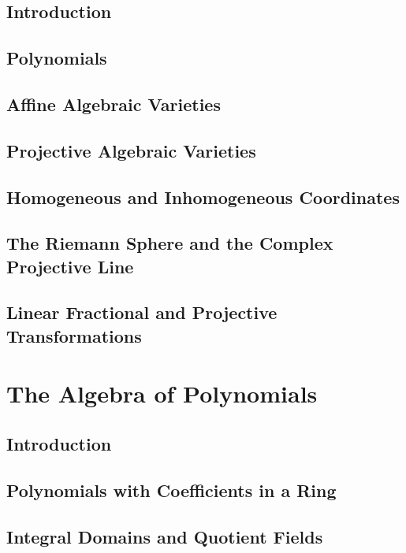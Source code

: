 \documentclass[12pt]{book}
\theoremstyle{plain}
\theoremstyle{definition}
\begin{document}
\section{Introduction}

\section{Polynomials}

\section{Affine Algebraic Varieties}

\section{Projective Algebraic Varieties}

\section{Homogeneous and Inhomogeneous Coordinates}

\section{The Riemann Sphere and the Complex Projective Line}

\section{Linear Fractional and Projective Transformations}

\chapter{The Algebra of Polynomials}

\section{Introduction}

\section{Polynomials with Coefficients in a Ring}

\section{Integral Domains and Quotient Fields}
\end{document}
